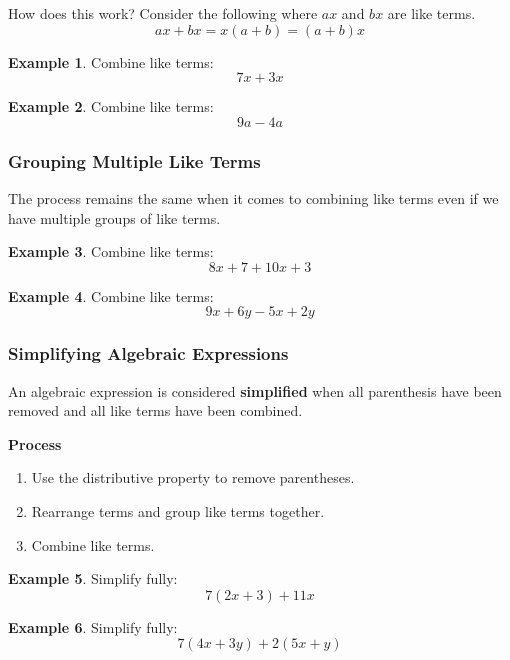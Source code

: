 \documentclass[addpoints,12pt]{exam}
\theoremstyle{definition}
\newtheorem{example}{Example}[subsection]
\begin{document}
\noindent How does this work? Consider the following where $ax$ and $bx$ are like terms.
\[ax + bx = x(a + b) = (a+b)x\]

\begin{example}
Combine like terms: \[7x + 3x\]
\vspace{.75in}
\end{example}

\begin{example}
Combine like terms: \[9a-4a\]
\vspace{.75in}
\end{example}

\subsubsection*{Grouping Multiple Like Terms}
\noindent The process remains the same when it comes to combining like terms even if we have multiple groups of like terms.

\begin{example}
Combine like terms: \[8x + 7 + 10x + 3\]
\vspace{1in}
\end{example}

\begin{example}
Combine like terms: \[9x + 6y - 5x + 2y\]
\vspace{1in}
\end{example}

\newpage

\subsubsection*{Simplifying Algebraic Expressions}

\noindent An algebraic expression is considered \textbf{simplified} when all parenthesis have been removed and all like terms have been combined.

\vspace{.1in}

\begin{mdframed}
\textbf{Process}
\begin{enumerate}
\item Use the distributive property to remove parentheses.
\item Rearrange terms and group like terms together.
\item Combine like terms.
\end{enumerate}
\end{mdframed}

\begin{example}
Simplify fully: \[7(2x+3) + 11x\]
\vspace{1.55in}
\end{example}

\begin{example}
Simplify fully: \[7(4x+3y) + 2(5x+y)\]
\end{example}
\end{document}

